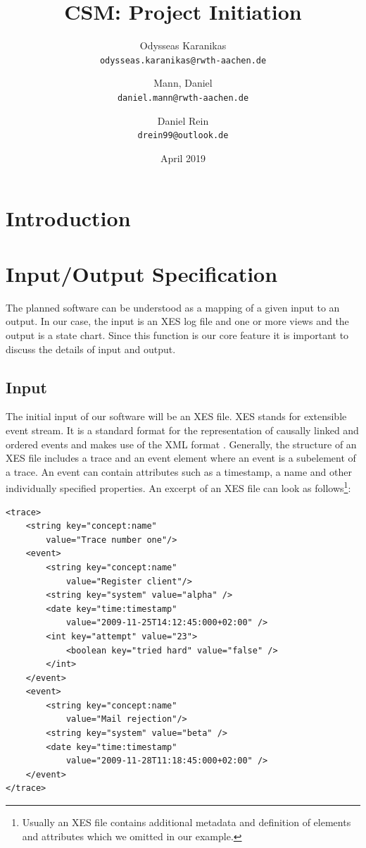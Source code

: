 \documentclass[12pt]{extarticle}
\title{CSM: Project Initiation}
\author{
Odysseas Karanikas\\
\texttt{odysseas.karanikas@rwth-aachen.de}
\and
Mann, Daniel\\
\texttt{daniel.mann@rwth-aachen.de}
\and
Daniel Rein\\
\texttt{drein99@outlook.de}
}
\date{April 2019}
\begin{document}
\maketitle

\section{Introduction}


\section{Input/Output Specification}
\label{sec:FR}

The planned software can be understood as a mapping of a given input to an output. In our case, the input is an XES log file and one or more views and the output is a state chart. Since this function is our core feature it is important to discuss the details of input and output.

\subsection{Input}

The initial input of our software will be an XES file. XES stands for extensible event stream. It is a standard format for the representation of causally linked and ordered events and makes use of the XML format \cite{xes}. Generally, the structure of an XES file includes a trace and an event element where an event is a subelement of a trace. An event can contain attributes such as a timestamp, a name and other individually specified properties. An excerpt of an XES file can look as follows\footnote{Usually an XES file contains additional metadata and definition of elements and attributes which we omitted in our example.}:


\begin{lstlisting}
<trace>
    <string key="concept:name" 
        value="Trace number one"/>
    <event>
        <string key="concept:name" 
            value="Register client"/>
        <string key="system" value="alpha" />
        <date key="time:timestamp" 
            value="2009-11-25T14:12:45:000+02:00" />
        <int key="attempt" value="23">
            <boolean key="tried hard" value="false" />
        </int>
    </event>
    <event>
        <string key="concept:name" 
            value="Mail rejection"/>
        <string key="system" value="beta" />
        <date key="time:timestamp" 
            value="2009-11-28T11:18:45:000+02:00" />
    </event>
</trace>
\end{lstlisting}
\end{document}
